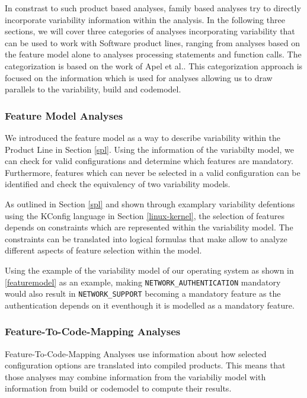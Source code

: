 \documentclass[a4paper]{article}
\begin{document}
In constrast to such product based analyses, family based analyses try to directly incorporate variability information within the analysis. In the following three sections, we will cover three categories of analyses incorporating variability that can be used to work with Software product lines, ranging from analyses based on the feature model alone  to analyses processing statements and function calls. The categorization is based on the work of Apel et al.\cite{Apel:2013:FSP:2541773}. This categorization approach is  focused on the information which is used for analyses allowing us to draw parallels to the variability, build and codemodel.

\subsubsection{Feature Model Analyses}

We introduced the feature model as a way to describe variability within the Product Line in Section \ref{spl}. Using the information of the variabilty model, we can check for valid configurations and determine which features are mandatory.
Furthermore, features which can never be selected in a valid configuration can be identified and check the equivalency of two variability models.

As outlined in Section \ref{spl} and shown through examplary variability defentions using the KConfig language in Section \ref{linux-kernel}, the selection of features depends on constraints which are represented within the variability model. The constraints can be translated into logical formulas that make allow to analyze different aspects of feature selection within the model.

Using the example of the variability model of our operating system as shown in \autoref{featuremodel} as an example, making \texttt{NETWORK\_AUTHENTICATION} mandatory would also result in \texttt{NETWORK\_SUPPORT} becoming a mandatory feature as the authentication depends on it eventhough it is modelled as a mandatory feature.

\subsubsection{Feature-To-Code-Mapping Analyses}\label{feature-code-mapping}

Feature-To-Code-Mapping Analyses use information about how selected configuration options are translated into compiled products. This means that those analyses may combine information from the variabiliy model with information from build or codemodel to compute their results.
\end{document}

